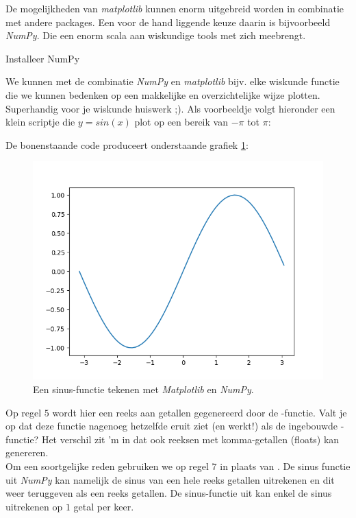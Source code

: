 De mogelijkheden van \textit{matplotlib} kunnen enorm uitgebreid worden in combinatie met andere packages. Een voor de hand liggende keuze daarin is bijvoorbeeld \textit{NumPy}. Die een enorm scala aan wiskundige tools met zich meebrengt. 

\begin{exercise}
Installeer NumPy 
\end{exercise}
We kunnen met de combinatie \textit{NumPy} en \textit{matplotlib} bijv. elke wiskunde functie die we kunnen bedenken op een makkelijke en overzichtelijke wijze plotten. Superhandig voor je wiskunde huiswerk ;). Als voorbeeldje volgt hieronder een klein scriptje die $y = sin(x)$ plot op een bereik van $-\pi$ tot $\pi$:

\newpage


De bonenstaande code produceert onderstaande grafiek \ref{fig:plot3}:
\begin{figure}[h!]
\centering\includegraphics[scale=0.7]{Pictures/chapter07/sin.png}
\caption{Een sinus-functie tekenen met \textit{Matplotlib} en \textit{NumPy}.}
\label{fig:plot3} 
\end{figure}

Op regel $5$ wordt hier een reeks aan getallen gegenereerd door de -functie. Valt je op dat deze functie nagenoeg hetzelfde eruit ziet (en werkt!) als de ingebouwde -functie? Het verschil zit 'm in dat  ook reeksen met komma-getallen (floats) kan genereren. \\ 
Om een soortgelijke reden gebruiken we op regel $7$  in plaats van . De sinus functie uit \textit{NumPy} kan namelijk de sinus van een hele reeks getallen uitrekenen en dit weer teruggeven als een reeks getallen. De sinus-functie uit  kan enkel de sinus uitrekenen op $1$ getal per keer.
 
